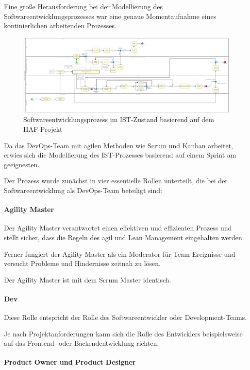 Eine große Herausforderung bei der Modellierung des Softwareentwicklungsprozesses war eine genaue Momentaufnahme eines kontinierlichen arbeitenden Prozesses. 

\begin{figure}[p]
    \centering
    \includegraphics[angle=90, scale=0.7]{Bilder/IST-Prozess.png}
    \caption{Softwareentwicklungsprozess im IST-Zustand basierend auf dem HAF-Projekt}
\end{figure}

Da das DevOps-Team mit agilen Methoden wie Scrum und Kanban arbeitet, erwies sich die Modellierung des IST-Prozesses basierend auf einem Sprint am geeignesten. 

Der Prozess wurde zunächst in vier essentielle Rollen unterteilt, die bei der Softwareentwicklung als DevOps-Team beteiligt sind: 

\paragraph{Agility Master}

Der Agility Master verantwortet einen effektiven und effizienten Prozess und stellt sicher, dass die Regeln des agil und Lean Management eingehalten werden. 

Ferner fungiert der Agility Master als ein Moderator für Team-Ereignisse und versucht Probleme und Hindernisse zeitnah zu lösen. 

Der Agility Master ist mit dem Scrum Master identisch. 

\paragraph{Dev}

Diese Rolle entspricht der Rolle des Softwareentwickler oder Development-Teams. 

Je nach Projektanforderungen kann sich die Rolle des Entwicklers beispielsweise auf das Frontend- oder Backendentwicklung richten.

\paragraph{Product Owner und Product Designer}

